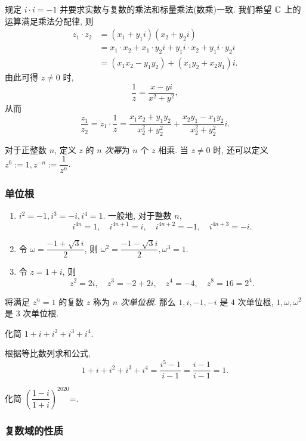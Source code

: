 \alert{规定 $i\cdot i=-1$} 并要求实数与复数的乘法和标量乘法(数乘)一致.
我们希望 ${\mathbb{C}}$ 上的运算满足乘法分配律, 则
  \begin{align*}
    z_1\cdot z_2&=(x_1+y_1i)(x_2+y_2i)\\
    &=x_1\cdot x_2+x_1\cdot y_2i+y_1i\cdot x_2+y_1i\cdot y_2i\\
    &=(x_1x_2-y_1y_2)+(x_1y_2+x_2y_1)i.
  \end{align*}
由此可得 $z\neq0$ 时,
  \[\frac1{z}=\frac{x-yi}{x^2+y^2},\]
从而
  \[\frac{z_1}{z_2}=z_1\cdot\frac1z=\frac{x_1x_2+y_1y_2}{x_2^2+y_2^2}+\frac{x_2y_1-x_1y_2}{x_2^2+y_2^2}i.\]

对于正整数 $n$, 定义 $z$ 的 \emph{$n$ 次幂}为 $n$ 个 $z$ 相乘.
当 $z\neq 0$ 时, 还可以定义 $z^0:=1,z^{-n}:=\dfrac1{z^n}$.

\subsubsection*{单位根}
\begin{example}
  \begin{enumerate}
    \item $i^2=-1,i^3=-i,i^4=1$.
    一般地, 对于整数 $n$, 
    \[i^{4n}=1,\quad i^{4n+1}=i,\quad i^{4n+2}=-1,\quad i^{4n+3}=-i.\]
    \item 令 $\omega=\dfrac{-1+\sqrt 3i}2$, 则 $\omega^2=\dfrac{-1-\sqrt3i}2,\omega^3=1$.
    \item 令 $z=1+i$, {则
    \[z^2=2i,\quad z^3=-2+2i,\quad z^4=-4,\quad z^8=16=2^4.\]}
  \end{enumerate}
  将满足 $z^n=1$ 的复数 $z$ 称为 \emph{$n$ 次单位根}.
  那么 $1,i,-1,-i$ 是 $4$ 次单位根, $1,\omega,\omega^2$ 是 $3$ 次单位根.
\end{example}

\begin{example}
  化简 $1+i+i^2+i^3+i^4$.
\end{example}
\begin{solution}
  根据等比数列求和公式,
  \[1+i+i^2+i^3+i^4=\frac{i^5-1}{i-1}
  {=\frac{i-1}{i-1}=1.}\]
\end{solution}

\begin{exercise}
  化简 $\left(\dfrac{1-i}{1+i}\right)^{2020}$=\fillblank{}.
\end{exercise}

\subsubsection*{复数域的性质}

